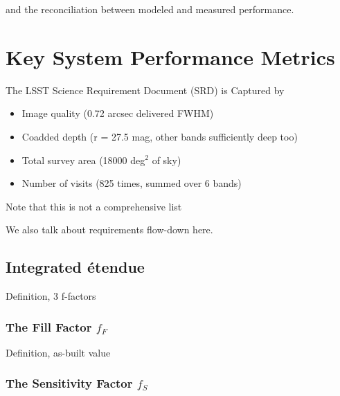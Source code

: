 
and the reconciliation between modeled and measured performance.

\section{Key System Performance Metrics}

The LSST Science Requirement Document (SRD) is Captured by

\begin{itemize}
\item Image quality (0.72 arcsec delivered FWHM)

\item Coadded depth (r = 27.5 mag, other bands sufficiently deep too)

\item Total survey area (18000 deg$^2$ of sky)

\item Number of visits (825 times, summed over 6 bands)
\end{itemize}

Note that this is not a comprehensive list

We also talk about requirements flow-down here.



\subsection{Integrated \'etendue}

Definition, 3 f-factors

\subsubsection{The Fill Factor $f_F$}

Definition, as-built value

\subsubsection{The Sensitivity Factor $f_S$}

